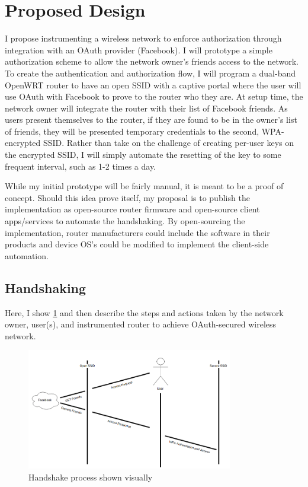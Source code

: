 \section{Proposed Design}
\label{section:propeseddesign}
I propose instrumenting a wireless network to enforce authorization through integration with an
OAuth provider (Facebook). I will prototype a simple authorization scheme to allow the network
owner's friends access to the network. To create the authentication and authorization flow, I will
program a dual-band OpenWRT router to have an open SSID with a captive portal where the user will
use OAuth with Facebook to prove to the router who they are. At setup time, the network owner will
integrate the router with their list of Facebook friends. As users present themselves to the router,
if they are found to be in the owner's list of friends, they will be presented temporary credentials
to the second, WPA-encrypted SSID. Rather than take on the challenge of creating per-user keys on
the encrypted SSID, I will simply automate the resetting of the key to some frequent interval, such
as 1-2 times a day.

While my initial prototype will be fairly manual, it is meant to be a proof of concept. Should this
idea prove itself, my proposal is to publish the implementation as open-source router firmware and
open-source client apps/services to automate the handshaking. By open-sourcing the implementation,
router manufacturers could include the software in their products and device OS's could be modified
to implement the client-side automation.

\subsection{Handshaking}
Here, I show \ref{fig:handshake} and then describe the steps and actions taken by the network owner, user(s), and instrumented router to
achieve OAuth-secured wireless network.

\begin{figure}[ht!]
\centering
\includegraphics[width=90mm]{fig/handshake.png}
\caption{Handshake process shown visually}
\label{fig:handshake}
\end{figure}

